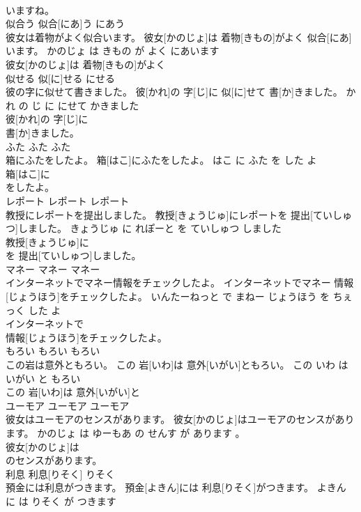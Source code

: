 \documentclass[8pt]{extreport}
\begin{document}
\begin{CJK}{UTF8}{min}
\\	いますね。			
\\	似合う	似合[にあ]う	にあう	
\\	彼女は着物がよく似合います。	彼女[かのじょ]は 着物[きもの]がよく 似合[にあ]います。	かのじょ は きもの が よく にあいます	
\\	彼女[かのじょ]は 着物[きもの]がよく
\\	似せる	似[に]せる	にせる	
\\	彼の字に似せて書きました。	彼[かれ]の 字[じ]に 似[に]せて 書[か]きました。	かれ の じ に にせて かきました	
\\	彼[かれ]の 字[じ]に
\\	書[か]きました。			
\\	ふた	ふた	ふた	
\\	箱にふたをしたよ。	箱[はこ]にふたをしたよ。	はこ に ふた を した よ	
\\	箱[はこ]に
\\	をしたよ。			
\\	レポート	レポート	レポート	
\\	教授にレポートを提出しました。	教授[きょうじゅ]にレポートを 提出[ていしゅつ]しました。	きょうじゅ に れぽーと を ていしゅつ しました	
\\	教授[きょうじゅ]に
\\	を 提出[ていしゅつ]しました。			
\\	マネー	マネー	マネー	
\\	インターネットでマネー情報をチェックしたよ。	インターネットでマネー 情報[じょうほう]をチェックしたよ。	いんたーねっと で まねー じょうほう を ちぇっく した よ	
\\	インターネットで
\\	情報[じょうほう]をチェックしたよ。			
\\	もろい	もろい	もろい	
\\	この岩は意外ともろい。	この 岩[いわ]は 意外[いがい]ともろい。	この いわ は いがい と もろい	
\\	この 岩[いわ]は 意外[いがい]と
\\	ユーモア	ユーモア	ユーモア	
\\	彼女はユーモアのセンスがあります。	彼女[かのじょ]はユーモアのセンスがあります。	かのじょ は ゆーもあ の せんす が あります 。	
\\	彼女[かのじょ]は
\\	のセンスがあります。			
\\	利息	利息[りそく]	りそく	
\\	預金には利息がつきます。	預金[よきん]には 利息[りそく]がつきます。	よきん に は りそく が つきます	

\end{CJK}
\end{document}
